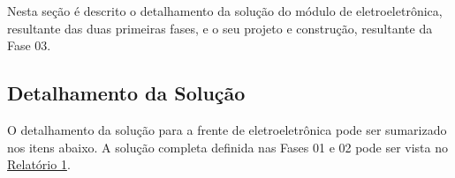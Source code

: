 \label{desenvolvimento_eletroeletronica}

Nesta seção é descrito o detalhamento da solução do módulo de eletroeletrônica, resultante das duas primeiras fases, 
e o seu projeto e construção, resultante da Fase 03.

\subsection{Detalhamento da Solução}

  O detalhamento da solução para a frente de eletroeletrônica pode ser sumarizado nos itens abaixo. A solução completa definida nas 
  Fases 01 e 02 pode ser vista no \href{https://drive.google.com/file/d/0B5InkGKx6O-MR1B3eVYzZFpjQ3c/view?usp=sharing}{Relatório 1}. 

